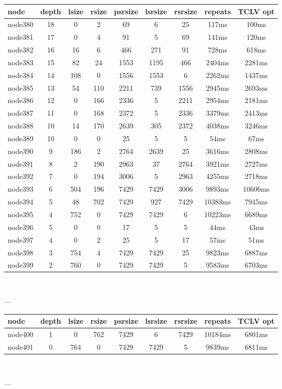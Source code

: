 \begin{tabular}{|l|c|c|c|c|c|c|c|c|}
\hline node & depth & lsize & rsize & psrsize & lsrsize & rsrsize   & repeats & TCLV opt\\
    \hline node380 & 18 & 0 & 2 & 69 & 6 & 25 & 117ms & 100ms\\
    \hline node381 & 17 & 0 & 4 & 91 & 5 & 69 & 141ms & 120ms\\
    \hline node382 & 16 & 16 & 6 & 466 & 271 & 91 & 728ms & 618ms\\
    \hline node383 & 15 & 82 & 24 & 1553 & 1195 & 466 & 2404ms & 2281ms\\
    \hline node384 & 14 & 108 & 0 & 1556 & 1553 & 6 & 2262ms & 1437ms\\
    \hline node385 & 13 & 54 & 110 & 2211 & 739 & 1556 & 2945ms & 2693ms\\
    \hline node386 & 12 & 0 & 166 & 2336 & 5 & 2211 & 2954ms & 2181ms\\
    \hline node387 & 11 & 0 & 168 & 2372 & 5 & 2336 & 3379ms & 2413ms\\
    \hline node388 & 10 & 14 & 170 & 2639 & 305 & 2372 & 4038ms & 3246ms\\
    \hline node389 & 10 & 0 & 0 & 25 & 5 & 5 & 54ms & 67ms\\
    \hline node390 & 9 & 186 & 2 & 2764 & 2639 & 25 & 3616ms & 2808ms\\
    \hline node391 & 8 & 2 & 190 & 2963 & 37 & 2764 & 3921ms & 2727ms\\
    \hline node392 & 7 & 0 & 194 & 3006 & 5 & 2963 & 4255ms & 2718ms\\
    \hline node393 & 6 & 504 & 196 & 7429 & 7429 & 3006 & 9893ms & 10606ms\\
    \hline node394 & 5 & 48 & 702 & 7429 & 927 & 7429 & 10383ms & 7945ms\\
    \hline node395 & 4 & 752 & 0 & 7429 & 7429 & 6 & 10223ms & 6689ms\\
    \hline node396 & 5 & 0 & 0 & 17 & 5 & 5 & 44ms & 43ms\\
    \hline node397 & 4 & 0 & 2 & 25 & 5 & 17 & 57ms & 51ms\\
    \hline node398 & 3 & 754 & 4 & 7429 & 7429 & 25 & 9823ms & 6887ms\\
    \hline node399 & 2 & 760 & 0 & 7429 & 7429 & 5 & 9583ms & 6703ms\\

\hline
\end{tabular} \

---


\begin{tabular}{|l|c|c|c|c|c|c|c|c|}
\hline node & depth & lsize & rsize & psrsize & lsrsize & rsrsize   & repeats & TCLV opt\\
    \hline node400 & 1 & 0 & 762 & 7429 & 6 & 7429 & 10184ms & 6801ms\\
    \hline node401 & 0 & 764 & 0 & 7429 & 7429 & 5 & 9839ms & 6811ms\\

\hline
\end{tabular} \

---

